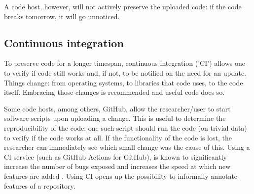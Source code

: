 A code host, however, will not actively preserve the uploaded code:
if the code breaks tomorrow, it will go unnoticed.

\subsection{Continuous integration}

To preserve code for a longer timespan, 
continuous integration ('CI') allows one to 
verify if code still works and, if not, to be notified on the need for an update.
Things change: from operating systems, to libraries that code uses,
to the code itself. 
Embracing those changes is recommended \cite{beck2000extreme} 
and useful code does so.


Some code hosts, among others, GitHub, 
allow the researcher/user to start software scripts upon uploading a change.
This is useful to determine the reproducibility of the code: 
one such script should run the code (on trivial data) 
to verify if the code works at all.
If the functionality of the code is lost, the researcher
can immediately see which small change was the cause of this.
Using a CI service (such as GitHub Actions for GitHub), 
is known to significantly 
increase the number of bugs exposed \cite{vasilescu2015} and increases
the speed at which new features are added \cite{vasilescu2015}.
Using CI opens up the possibility to informally annotate features of
a repository. 

